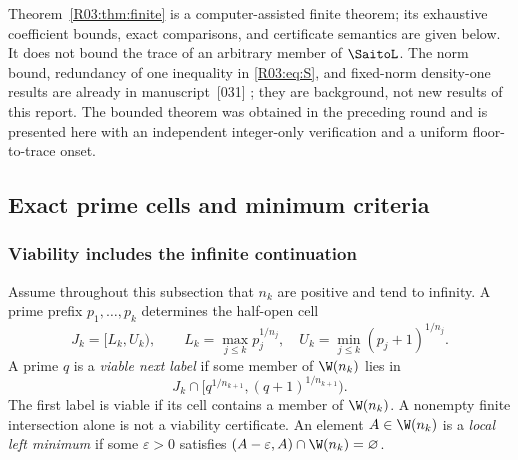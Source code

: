 \documentclass[11pt,a4paper]{article}
\theoremstyle{definition}\newtheorem{definition}[theorem]{Definition}
\theoremstyle{remark}\newtheorem{remark}[theorem]{Remark}
\begin{document}
Theorem~\ref{R03:thm:finite} is a computer-assisted finite theorem;
its exhaustive coefficient bounds, exact comparisons, and certificate
semantics are given below. It does not bound the trace of an arbitrary
member of $\SaitoL$. The norm bound, redundancy of one inequality in
\eqref{R03:eq:S}, and fixed-norm density-one results are already in
manuscript~[031] \cite{K031}; they are background, not new results
of this report. The bounded theorem was obtained in the preceding
round and is presented here with an independent integer-only
verification and a uniform floor-to-trace onset.

\subsection{Exact prime cells and minimum criteria}\label{R03:sec:cells}

\subsubsection{Viability includes the infinite continuation}

Assume throughout this subsection that $n_k$ are positive and tend to
infinity. A prime prefix $p_1,\ldots,p_k$ determines the half-open cell
\begin{equation}\label{R03:eq:prefix}
 J_k=[L_k,U_k),\qquad
 L_k=\max_{j\le k}p_j^{1/n_j},\quad
 U_k=\min_{j\le k}(p_j+1)^{1/n_j}.
\end{equation}
A prime $q$ is a \emph{viable next label} if some member of
$\W(n_k)$ lies in
\[
 J_k\cap[q^{1/n_{k+1}},(q+1)^{1/n_{k+1}}).
\]
The first label is viable if its cell contains a member of $\W(n_k)$.
A nonempty finite intersection alone is not a viability certificate.
An element $A\in\W(n_k)$ is a \emph{local left minimum} if some
$\varepsilon>0$ satisfies $(A-\varepsilon,A)\cap\W(n_k)=\varnothing$.
\end{document}
